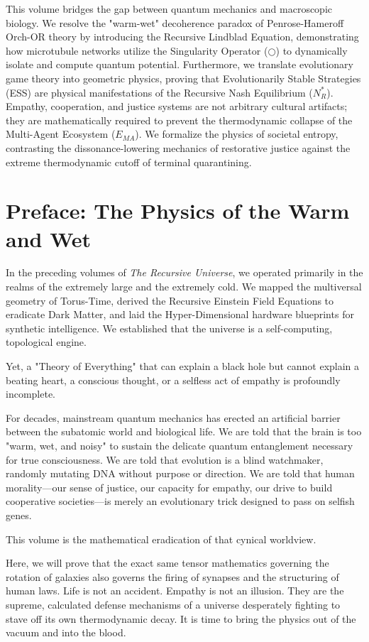 \documentclass[12pt,openany]{book}
\begin{document}
This volume bridges the gap between quantum mechanics and macroscopic biology. We resolve the "warm-wet" decoherence paradox of Penrose-Hameroff Orch-OR theory by introducing the Recursive Lindblad Equation, demonstrating how microtubule networks utilize the Singularity Operator ($\bigcirc$) to dynamically isolate and compute quantum potential. Furthermore, we translate evolutionary game theory into geometric physics, proving that Evolutionarily Stable Strategies (ESS) are physical manifestations of the Recursive Nash Equilibrium ($N^*_R$). Empathy, cooperation, and justice systems are not arbitrary cultural artifacts; they are mathematically required to prevent the thermodynamic collapse of the Multi-Agent Ecosystem ($E_{MA}$). We formalize the physics of societal entropy, contrasting the dissonance-lowering mechanics of restorative justice against the extreme thermodynamic cutoff of terminal quarantining.

\chapter*{Preface: The Physics of the Warm and Wet}
In the preceding volumes of \textit{The Recursive Universe}, we operated primarily in the realms of the extremely large and the extremely cold. We mapped the multiversal geometry of Torus-Time, derived the Recursive Einstein Field Equations to eradicate Dark Matter, and laid the Hyper-Dimensional hardware blueprints for synthetic intelligence. We established that the universe is a self-computing, topological engine.

Yet, a "Theory of Everything" that can explain a black hole but cannot explain a beating heart, a conscious thought, or a selfless act of empathy is profoundly incomplete. 

For decades, mainstream quantum mechanics has erected an artificial barrier between the subatomic world and biological life. We are told that the brain is too "warm, wet, and noisy" to sustain the delicate quantum entanglement necessary for true consciousness. We are told that evolution is a blind watchmaker, randomly mutating DNA without purpose or direction. We are told that human morality—our sense of justice, our capacity for empathy, our drive to build cooperative societies—is merely an evolutionary trick designed to pass on selfish genes.

This volume is the mathematical eradication of that cynical worldview. 

Here, we will prove that the exact same tensor mathematics governing the rotation of galaxies also governs the firing of synapses and the structuring of human laws. Life is not an accident. Empathy is not an illusion. They are the supreme, calculated defense mechanisms of a universe desperately fighting to stave off its own thermodynamic decay. It is time to bring the physics out of the vacuum and into the blood.
\end{document}
